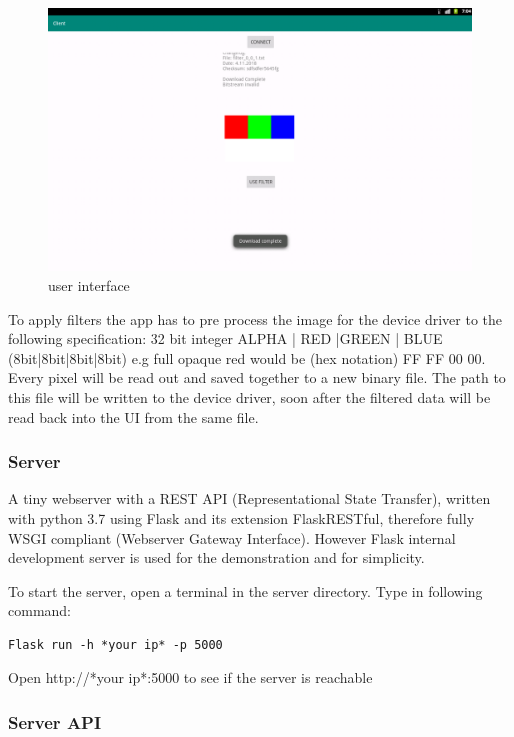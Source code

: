 \begin{figure}[h]
\centering
\includegraphics[width=1\textwidth]{sections/methodology/clientdownload.png}
\caption{\label{fig:gic} user interface}
\end{figure}

To apply filters the app has to pre process the image for the device driver to the following specification:
32 bit integer
ALPHA | RED |GREEN | BLUE (8bit|8bit|8bit|8bit) e.g full opaque red would be (hex notation) FF FF 00 00. Every pixel will be read out and saved together to a new binary file. 
The path to this file will be written to the device driver, soon after the filtered data will be read back into the UI from the same file.


\subsubsection{Server}

A tiny webserver with a REST API (Representational State Transfer), 
written with python 3.7 using Flask and its extension FlaskRESTful, therefore fully WSGI compliant
(Webserver Gateway Interface). However Flask internal development server is used for the demonstration and for simplicity.

To start the server, open a terminal in the server directory. Type in following command:
\begin{verbatim}
Flask run -h *your ip* -p 5000    
\end{verbatim}
Open http://*your ip*:5000 to see if the server is reachable

\subsubsection{Server API}

